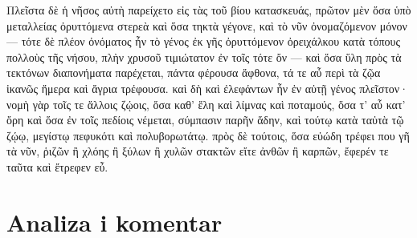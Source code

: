 {\large
\begin{greek}
\noindent Πλεῖστα δὲ ἡ νῆσος αὐτὴ παρείχετο εἰς τὰς τοῦ βίου κατασκευάς, πρῶτον μὲν ὅσα ὑπὸ μεταλλείας ὀρυττόμενα στερεὰ καὶ ὅσα τηκτὰ γέγονε, καὶ τὸ νῦν ὀνομαζόμενον μόνον — τότε δὲ πλέον ὀνόματος ἦν τὸ γένος ἐκ γῆς ὀρυττόμενον ὀρειχάλκου κατὰ τόπους πολλοὺς τῆς νήσου, πλὴν χρυσοῦ τιμιώτατον ἐν τοῖς τότε ὄν — καὶ ὅσα ὕλη πρὸς τὰ τεκτόνων διαπονήματα παρέχεται, πάντα φέρουσα ἄφθονα, τά τε αὖ περὶ τὰ ζῷα ἱκανῶς ἥμερα καὶ ἄγρια τρέφουσα. καὶ δὴ καὶ ἐλεφάντων ἦν ἐν αὐτῇ γένος πλεῖστον· νομὴ γὰρ τοῖς τε ἄλλοις ζῴοις, ὅσα καθ' ἕλη καὶ λίμνας καὶ ποταμούς, ὅσα τ' αὖ κατ' ὄρη καὶ ὅσα ἐν τοῖς πεδίοις νέμεται, σύμπασιν παρῆν ἅδην, καὶ τούτῳ κατὰ ταὐτὰ τῷ ζῴῳ, μεγίστῳ πεφυκότι καὶ πολυβορωτάτῳ. πρὸς δὲ τούτοις, ὅσα εὐώδη τρέφει που γῆ τὰ νῦν, ῥιζῶν ἢ χλόης ἢ ξύλων ἢ χυλῶν στακτῶν εἴτε ἀνθῶν ἢ καρπῶν, ἔφερέν τε ταῦτα καὶ ἔτρεφεν εὖ.
\end{greek}

}

\section*{Analiza i komentar}


